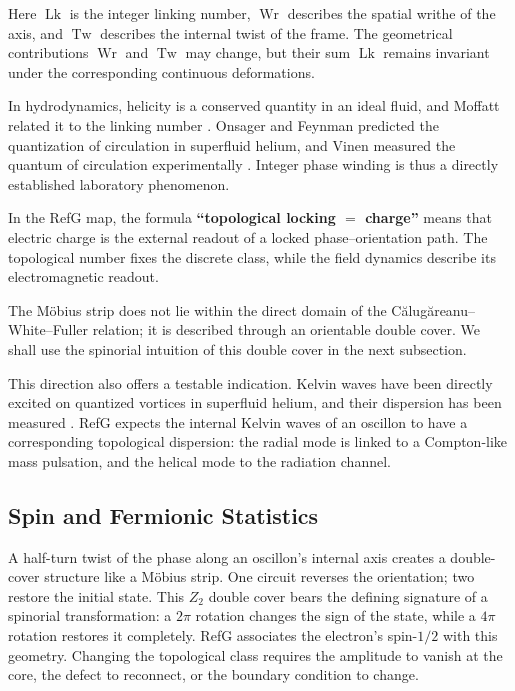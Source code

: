 \documentclass[11pt,a4paper]{article}
\begin{document}
Here $\operatorname{Lk}$ is the integer linking number, $\operatorname{Wr}$ describes the spatial writhe of the axis, and $\operatorname{Tw}$ describes the internal twist of the frame. The geometrical contributions $\operatorname{Wr}$ and $\operatorname{Tw}$ may change, but their sum $\operatorname{Lk}$ remains invariant under the corresponding continuous deformations.

In hydrodynamics, helicity is a conserved quantity in an ideal fluid, and Moffatt related it to the linking number \citep{moffatt1969}. Onsager and Feynman predicted the quantization of circulation in superfluid helium, and Vinen measured the quantum of circulation experimentally \citep{onsager1949,feynman1955,vinen1961}. Integer phase winding is thus a directly established laboratory phenomenon.

In the RefG map, the formula \textbf{``topological locking $=$ charge''} means that electric charge is the external readout of a locked phase--orientation path. The topological number fixes the discrete class, while the field dynamics describe its electromagnetic readout.

The Möbius strip does not lie within the direct domain of the Călugăreanu--White--Fuller relation; it is described through an orientable double cover. We shall use the spinorial intuition of this double cover in the next subsection.

This direction also offers a testable indication. Kelvin waves have been directly excited on quantized vortices in superfluid helium, and their dispersion has been measured \citep{minowa2025}. RefG expects the internal Kelvin waves of an oscillon to have a corresponding topological dispersion: the radial mode is linked to a Compton-like mass pulsation, and the helical mode to the radiation channel.

\subsection{Spin and Fermionic Statistics}

A half-turn twist of the phase along an oscillon's internal axis creates a double-cover structure like a Möbius strip. One circuit reverses the orientation; two restore the initial state. This $Z_2$ double cover bears the defining signature of a spinorial transformation: a $2\pi$ rotation changes the sign of the state, while a $4\pi$ rotation restores it completely. RefG associates the electron's spin-$1/2$ with this geometry. Changing the topological class requires the amplitude to vanish at the core, the defect to reconnect, or the boundary condition to change.
\end{document}
